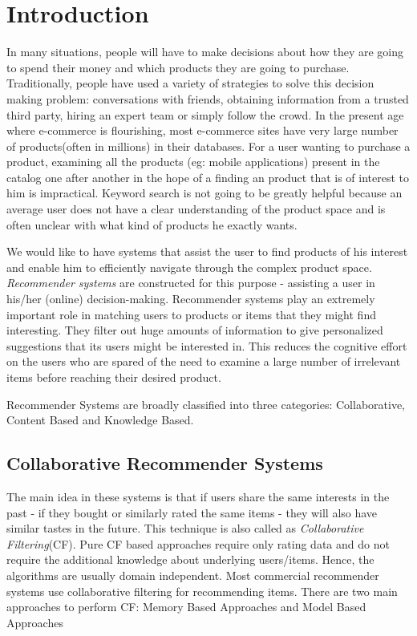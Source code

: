 
\chapter{Introduction}
\label{chap:intro}
In many situations, people will have to make decisions about how they are going to spend their money and which products they are going to purchase.
Traditionally, people have used a variety of strategies to solve this decision making problem: conversations with friends, obtaining information from a trusted third party, hiring an expert team or simply follow the crowd. 
In the present age where e-commerce is flourishing, most e-commerce sites have very large number of products(often in millions) in their databases.
For a user wanting to purchase a product, examining all the products (eg: mobile applications) present in the catalog one after another in the hope of a finding an product that is of interest to him is impractical.
Keyword search is not going to be greatly helpful because an average user does not have a clear understanding of the product space and is often unclear with what kind of products he exactly wants.

We would like to have systems that assist the user to find products of his interest and enable him to efficiently navigate through the complex product space.
\textit{Recommender systems} are constructed for this purpose - assisting a user in his/her (online) decision-making.
Recommender systems play an extremely important role in matching users to products or items that they might find interesting. 
They filter out huge amounts of information to give personalized suggestions that its users might be interested in. 
This reduces the cognitive effort on the users who are spared of the need to examine a large number of irrelevant items before reaching their desired product.

Recommender Systems are broadly classified into three categories: Collaborative, Content Based and Knowledge Based.

\section{Collaborative Recommender Systems}
\label{sec:CF}
 The main idea in these systems is that if users share the same interests in the past - if they bought or similarly rated the same items - they will also have similar tastes in the future. 
This technique is also called as \textit{Collaborative Filtering}(CF). 
Pure CF based approaches require only rating data and do not require the additional knowledge about underlying users/items. 
Hence, the algorithms are usually domain independent. Most commercial recommender systems use collaborative filtering for recommending items.
There are two main approaches to perform CF: Memory Based Approaches and Model Based Approaches

